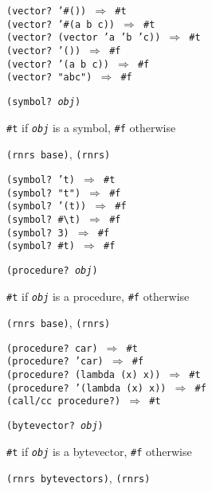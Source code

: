 \begin{alltt}
(vector? '\#{}()) \(\Rightarrow\) \#{}t
(vector? '\#{}(a b c)) \(\Rightarrow\) \#{}t
(vector? (vector 'a 'b 'c)) \(\Rightarrow\) \#{}t
(vector? '()) \(\Rightarrow\) \#{}f
(vector? '(a b c)) \(\Rightarrow\) \#{}f
(vector? "abc") \(\Rightarrow\) \#{}f
\end{alltt}

\begin{description}

\label{objects_s22}\item[procedure] \texttt{(symbol? \textit{obj})}



\item[returns] \texttt{\#{}t} if \texttt{\textit{obj}} is a symbol, \texttt{\#{}f} otherwise


\item[libraries] \texttt{(rnrs base)}, \texttt{(rnrs)}
\end{description}


\begin{alltt}
(symbol? 't) \(\Rightarrow\) \#{}t
(symbol? "t") \(\Rightarrow\) \#{}f
(symbol? '(t)) \(\Rightarrow\) \#{}f
(symbol? \#{}\textbackslash{}t) \(\Rightarrow\) \#{}f
(symbol? 3) \(\Rightarrow\) \#{}f
(symbol? \#{}t) \(\Rightarrow\) \#{}f
\end{alltt}

\begin{description}

\label{objects_s23}\item[procedure] \texttt{(procedure? \textit{obj})}



\item[returns] \texttt{\#{}t} if \texttt{\textit{obj}} is a procedure, \texttt{\#{}f} otherwise


\item[libraries] \texttt{(rnrs base)}, \texttt{(rnrs)}
\end{description}


\begin{alltt}
(procedure? car) \(\Rightarrow\) \#{}t
(procedure? 'car) \(\Rightarrow\) \#{}f
(procedure? (lambda (x) x)) \(\Rightarrow\) \#{}t
(procedure? '(lambda (x) x)) \(\Rightarrow\) \#{}f
(call/cc procedure?) \(\Rightarrow\) \#{}t
\end{alltt}

\begin{description}

\label{objects_s24}\item[procedure] \texttt{(bytevector? \textit{obj})}



\item[returns] \texttt{\#{}t} if \texttt{\textit{obj}} is a bytevector, \texttt{\#{}f} otherwise


\item[libraries] \texttt{(rnrs bytevectors)}, \texttt{(rnrs)}
\end{description}


